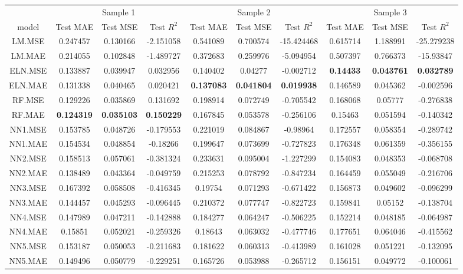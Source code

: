 \begin{table}[H]
\centering\begingroup\fontsize{6}{8}\selectfont

\begin{tabular}{cccccccccc}
\toprule
\multicolumn{1}{c}{ } & \multicolumn{3}{c}{Sample 1} & \multicolumn{3}{c}{Sample 2} & \multicolumn{3}{c}{Sample 3} \\
\cmidrule(l{3pt}r{3pt}){2-4} \cmidrule(l{3pt}r{3pt}){5-7} \cmidrule(l{3pt}r{3pt}){8-10}
model & Test MAE & Test MSE & Test $R^2$ & Test MAE & Test MSE & Test $R^2$ & Test MAE & Test MSE & Test $R^2$\\
\midrule
LM.MSE & 0.247457 & 0.130166 & -2.151058 & 0.541089 & 0.700574 & -15.424468 & 0.615714 & 1.188991 & -25.279238\\
LM.MAE & 0.214055 & 0.102848 & -1.489727 & 0.372683 & 0.259976 & -5.094954 & 0.507397 & 0.766373 & -15.93847\\
ELN.MSE & 0.133887 & 0.039947 & 0.032956 & 0.140402 & 0.04277 & -0.002712 & \textbf{0.14433} & \textbf{0.043761} & \textbf{0.032789}\\
ELN.MAE & 0.131338 & 0.040465 & 0.020421 & \textbf{0.137083} & \textbf{0.041804} & \textbf{0.019938} & 0.146589 & 0.045362 & -0.002596\\
RF.MSE & 0.129226 & 0.035869 & 0.131692 & 0.198914 & 0.072749 & -0.705542 & 0.168068 & 0.05777 & -0.276838\\
\addlinespace
RF.MAE & \textbf{0.124319} & \textbf{0.035103} & \textbf{0.150229} & 0.167845 & 0.053578 & -0.256106 & 0.15463 & 0.051594 & -0.140342\\
NN1.MSE & 0.153785 & 0.048726 & -0.179553 & 0.221019 & 0.084867 & -0.98964 & 0.172557 & 0.058354 & -0.289742\\
NN1.MAE & 0.154534 & 0.048854 & -0.18266 & 0.199647 & 0.073699 & -0.727823 & 0.176348 & 0.061359 & -0.356155\\
NN2.MSE & 0.158513 & 0.057061 & -0.381324 & 0.233631 & 0.095004 & -1.227299 & 0.154083 & 0.048353 & -0.068708\\
NN2.MAE & 0.138489 & 0.043364 & -0.049759 & 0.215253 & 0.078792 & -0.847234 & 0.164459 & 0.055049 & -0.216706\\
\addlinespace
NN3.MSE & 0.167392 & 0.058508 & -0.416345 & 0.19754 & 0.071293 & -0.671422 & 0.156873 & 0.049602 & -0.096299\\
NN3.MAE & 0.144457 & 0.045293 & -0.096445 & 0.210372 & 0.077747 & -0.822723 & 0.159841 & 0.05152 & -0.138704\\
NN4.MSE & 0.147989 & 0.047211 & -0.142888 & 0.184277 & 0.064247 & -0.506225 & 0.152214 & 0.048185 & -0.064987\\
NN4.MAE & 0.15851 & 0.052021 & -0.259326 & 0.18643 & 0.063032 & -0.477746 & 0.177651 & 0.064046 & -0.415562\\
NN5.MSE & 0.153187 & 0.050053 & -0.211683 & 0.181622 & 0.060313 & -0.413989 & 0.161028 & 0.051221 & -0.132095\\
\addlinespace
NN5.MAE & 0.149496 & 0.050779 & -0.229251 & 0.165726 & 0.053988 & -0.265712 & 0.156151 & 0.049772 & -0.100061\\
\bottomrule
\end{tabular}
\endgroup{}
\end{table}